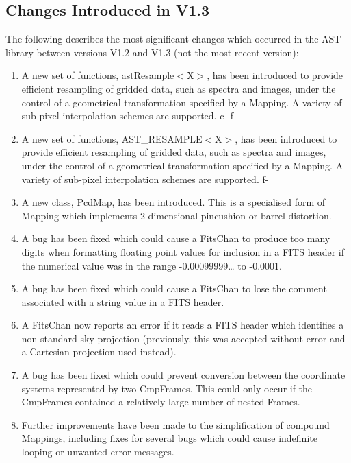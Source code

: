 \documentclass[twoside,11pt]{starlink}
\begin{document}
\subsection{Changes Introduced in V1.3}

The following describes the most significant changes which occurred in
the AST library between versions V1.2 and V1.3 (not the most recent
version):

\begin{enumerate}
c+
\item A new set of functions, astResample$<$X$>$, has been introduced to
provide	efficient resampling of gridded data, such as spectra and
images, under the control of a geometrical transformation specified by
a Mapping. A variety of sub-pixel interpolation schemes are supported.
c-
f+
\item A new set of functions, AST\_RESAMPLE$<$X$>$, has been introduced to
provide	efficient resampling of gridded data, such as spectra and
images, under the control of a geometrical transformation specified by
a Mapping. A variety of sub-pixel interpolation schemes are supported.
f-

\item A new class, PcdMap, has been introduced. This is a specialised
form of Mapping which implements 2-dimensional pincushion or barrel
distortion.

\item A bug has been fixed which could cause a FitsChan to produce too
many digits when formatting floating point values for inclusion in a
FITS header if the numerical value was in the range -0.00099999\ldots
to -0.0001.

\item A bug has been fixed which could cause a FitsChan to lose the
comment associated with a string value in a FITS header.

\item A FitsChan now reports an error if it reads a FITS header which
identifies a non-standard sky projection (previously, this was
accepted without error and a Cartesian projection used instead).

\item A bug has been fixed which could prevent conversion between the
coordinate systems represented by two CmpFrames. This could only occur
if the CmpFrames contained a relatively large number of nested Frames.

%
\item Further improvements have been made to the simplification of
compound Mappings, including fixes for several bugs which could cause
indefinite looping or unwanted error messages.


\end{enumerate}
\end{document}
